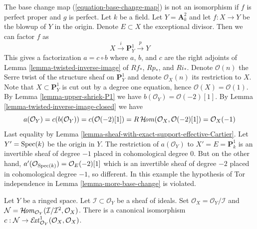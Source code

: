 \begin{example}
\label{example-base-change-wrong}
The base change map (\ref{equation-base-change-map}) is not an
isomorphism if $f$ is perfect proper and $g$ is perfect.
Let $k$ be a field. Let $Y = \mathbf{A}^2_k$ and let $f : X \to Y$
be the blowup of $Y$ in the origin. Denote $E \subset X$ the
exceptional divisor. Then we can factor $f$ as
$$
X \xrightarrow{i} \mathbf{P}^1_Y \xrightarrow{p} Y
$$
This gives a factorization $a = c \circ b$ where
$a$, $b$, and $c$ are the right adjoints of
Lemma \ref{lemma-twisted-inverse-image}
of $Rf_*$, $Rp_*$, and $Ri_*$. Denote $\mathcal{O}(n)$ the
Serre twist of the structure sheaf on $\mathbf{P}^1_Y$ and
denote $\mathcal{O}_X(n)$ its restriction to $X$.
Note that $X \subset \mathbf{P}^1_Y$ is cut out by
a degree one equation, hence $\mathcal{O}(X) = \mathcal{O}(1)$.
By Lemma \ref{lemma-upper-shriek-P1} we have
$b(\mathcal{O}_Y) = \mathcal{O}(-2)[1]$.
By Lemma \ref{lemma-twisted-inverse-image-closed}
we have
$$
a(\mathcal{O}_Y) = c(b(\mathcal{O}_Y)) =
c(\mathcal{O}(-2)[1]) =
R\mathop{\mathcal{H}\!\mathit{om}}\nolimits(\mathcal{O}_X, \mathcal{O}(-2)[1]) =
\mathcal{O}_X(-1)
$$
Last equality by Lemma \ref{lemma-sheaf-with-exact-support-effective-Cartier}.
Let $Y' = \mathop{\mathrm{Spec}}(k)$ be the origin in $Y$. The restriction of
$a(\mathcal{O}_Y)$ to $X' = E = \mathbf{P}^1_k$
is an invertible sheaf of degree $-1$ placed in cohomological
degree $0$. But on the other hand,
$a'(\mathcal{O}_{\mathop{\mathrm{Spec}}(k)}) = \mathcal{O}_E(-2)[1]$
which is an invertible sheaf of degree $-2$ placed in
cohomological degree $-1$, so different. In this example
the hypothesis of Tor independence in Lemma \ref{lemma-more-base-change}
is violated.
\end{example}

\begin{lemma}
\label{lemma-ext}
Let $Y$ be a ringed space. Let $\mathcal{I} \subset \mathcal{O}_Y$
be a sheaf of ideals. Set $\mathcal{O}_X = \mathcal{O}_Y/\mathcal{I}$ and
$\mathcal{N} =
\mathop{\mathcal{H}\!\mathit{om}}\nolimits_{\mathcal{O}_Y}(\mathcal{I}/\mathcal{I}^2, \mathcal{O}_X)$.
There is a canonical isomorphism
$c : \mathcal{N} \to
\mathop{\mathcal{E}\!\mathit{xt}}\nolimits^1_{\mathcal{O}_Y}(\mathcal{O}_X, \mathcal{O}_X)
$.
\end{lemma}

